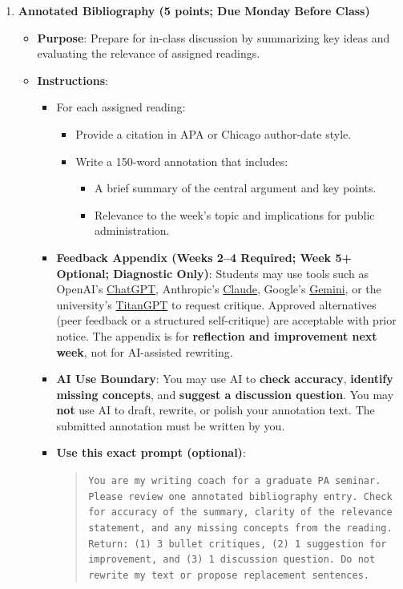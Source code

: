 \documentclass[11pt]{article}     %
\begin{document}
\begin{enumerate}
    \item \textbf{Annotated Bibliography (5 points; Due Monday Before Class)}
    \begin{itemize}
        \item \textbf{Purpose}: Prepare for in-class discussion by summarizing key ideas and evaluating the relevance of assigned readings.
        \item \textbf{Instructions}:
        \begin{itemize}
            \item For each assigned reading:
            \begin{itemize}
                \item Provide a citation in APA or Chicago author-date style.
                \item Write a 150-word annotation that includes:
                \begin{itemize}
                    \item A brief summary of the central argument and key points.
                    \item Relevance to the week's topic and implications for public administration.
                \end{itemize}
            \end{itemize}

            \item \textbf{Feedback Appendix (Weeks 2--4 Required; Week 5+ Optional; Diagnostic Only)}: Students may use tools such as OpenAI's \href{https://chat.openai.com/}{ChatGPT}, Anthropic's \href{https://www.anthropic.com/}{Claude}, Google's \href{https://www.google.com/search/about/}{Gemini}, or the university's \href{https://titangpt.fullerton.edu/auth/jwt/login}{TitanGPT} to request critique. Approved alternatives (peer feedback or a structured self-critique) are acceptable with prior notice. The appendix is for \textbf{reflection and improvement next week}, not for AI-assisted rewriting.

            \item \textbf{AI Use Boundary}: You may use AI to \textbf{check accuracy}, \textbf{identify missing concepts}, and \textbf{suggest a discussion question}. You may \textbf{not} use AI to draft, rewrite, or polish your annotation text. The submitted annotation must be written by you.

            \item \textbf{Use this exact prompt (optional)}:
            \begin{quote}
                \texttt{You are my writing coach for a graduate PA seminar. Please review one annotated bibliography entry. Check for accuracy of the summary, clarity of the relevance statement, and any missing concepts from the reading. Return: (1) 3 bullet critiques, (2) 1 suggestion for improvement, and (3) 1 discussion question. Do not rewrite my text or propose replacement sentences.}
            \end{quote}
        \end{itemize}
    \end{itemize}


\end{enumerate}
\end{document}

